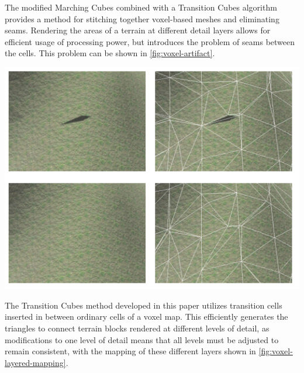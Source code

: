\documentclass[10pt]{report}
\begin{document}
		The modified Marching Cubes combined with a Transition Cubes algorithm provides a method for stitching together voxel-based meshes and eliminating seams. Rendering the areas of a terrain at different detail layers allows for efficient usage of processing power, but introduces the problem of seams between the cells. This problem can be shown in \autoref{fig:voxel-artifact}. 
		
		\begin{minipage}{\textwidth}
			\centering
			\includegraphics[scale=.75]{voxel-seam}
			\label{fig:voxel-artifact}
		\end{minipage}
		
		The Transition Cubes method developed in this paper utilizes transition cells inserted in between ordinary cells of a voxel map. This efficiently generates the triangles to connect terrain blocks rendered at different levels of detail, as modifications to one level of detail means that all levels must be adjusted to remain consistent, with the mapping of these different layers shown in \autoref{fig:voxel-layered-mapping}.
		
\end{document}
